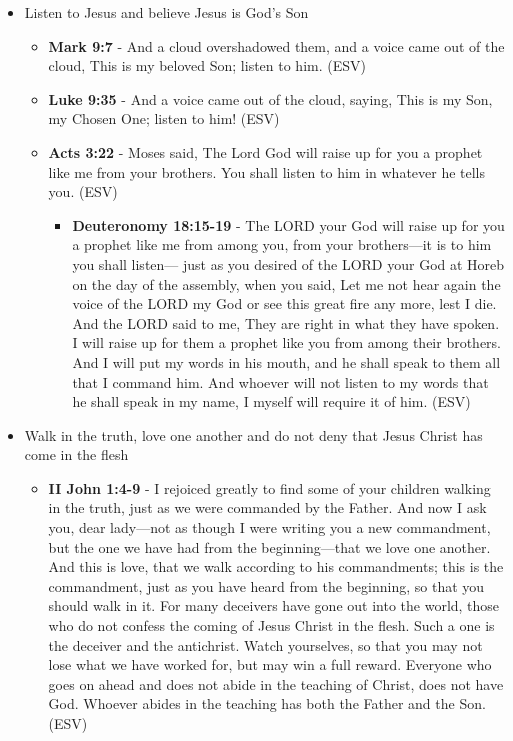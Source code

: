 \documentclass[11pt]{article}
\begin{document}
\begin{itemize}
\item Listen to Jesus and believe Jesus is God's Son
\begin{itemize}
\item \textbf{Mark 9:7} - And a cloud overshadowed them, and a voice came out of the cloud, This is my beloved Son; listen to him. (ESV)
\item \textbf{Luke 9:35} - And a voice came out of the cloud, saying, This is my Son, my Chosen One; listen to him! (ESV)
\item \textbf{Acts 3:22} - Moses said, The Lord God will raise up for you a prophet like me from your brothers. You shall listen to him in whatever he tells you. (ESV)
\begin{itemize}
\item \textbf{Deuteronomy 18:15-19} - The LORD your God will raise up for you a prophet like me from among you, from your brothers—it is to him you shall listen— just as you desired of the LORD your God at Horeb on the day of the assembly, when you said, Let me not hear again the voice of the LORD my God or see this great fire any more, lest I die. And the LORD said to me, They are right in what they have spoken. I will raise up for them a prophet like you from among their brothers. And I will put my words in his mouth, and he shall speak to them all that I command him. And whoever will not listen to my words that he shall speak in my name, I myself will require it of him. (ESV)
\end{itemize}
\end{itemize}
\item Walk in the truth, love one another and do not deny that Jesus Christ has come in the flesh
\begin{itemize}
\item \textbf{II John 1:4-9} - I rejoiced greatly to find some of your children walking in the truth, just as we were commanded by the Father. And now I ask you, dear lady—not as though I were writing you a new commandment, but the one we have had from the beginning—that we love one another. And this is love, that we walk according to his commandments; this is the commandment, just as you have heard from the beginning, so that you should walk in it. For many deceivers have gone out into the world, those who do not confess the coming of Jesus Christ in the flesh. Such a one is the deceiver and the antichrist. Watch yourselves, so that you may not lose what we have worked for, but may win a full reward. Everyone who goes on ahead and does not abide in the teaching of Christ, does not have God. Whoever abides in the teaching has both the Father and the Son. (ESV)
\end{itemize}
\end{itemize}
\end{document}
